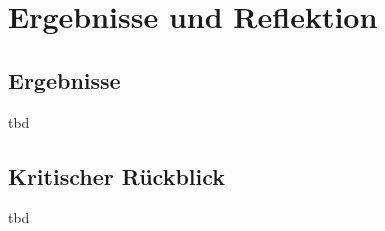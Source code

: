 \newpage


\section{Ergebnisse und Reflektion}

\subsection{Ergebnisse}
\color{red}
tbd
\color{black}

\subsection{Kritischer Rückblick}
\color{red}
tbd
\color{black}
